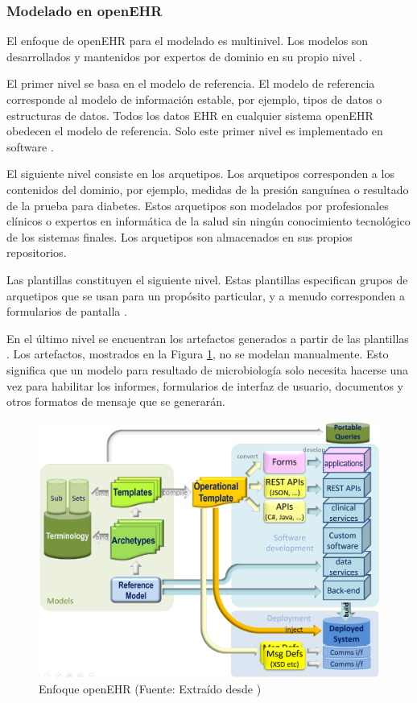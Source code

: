 \subsubsection{Modelado en openEHR}

El enfoque de openEHR para el modelado es multinivel. Los modelos son desarrollados y mantenidos por expertos de dominio en su propio nivel \cite{openEHRArchitecture}.

El primer nivel se basa en el modelo de referencia. El modelo de referencia corresponde al modelo de información estable, por ejemplo, tipos de datos o estructuras de datos. Todos los datos EHR en cualquier sistema openEHR obedecen el modelo de referencia. Solo este primer nivel es implementado en software \cite{openEHRArchitecture}.

El siguiente nivel consiste en los arquetipos. Los arquetipos corresponden a los contenidos del dominio, por ejemplo, medidas de la presión sanguínea o resultado de la prueba para diabetes. Estos arquetipos son modelados por profesionales clínicos o expertos en informática de la salud sin ningún conocimiento tecnológico de los sistemas finales. Los arquetipos son almacenados en sus propios repositorios.

Las plantillas constituyen el siguiente nivel. Estas plantillas especifican grupos de arquetipos que se usan para un propósito particular, y a menudo corresponden a formularios de pantalla \cite{openEHRArchitecture}.

En el último nivel se encuentran los artefactos generados a partir de las plantillas \cite{openEHR}. Los artefactos, mostrados en la Figura \ref{fig:openeEHR_ecosystem}, no se modelan manualmente. Esto significa que un modelo para resultado de microbiología solo necesita hacerse una vez para habilitar los informes, formularios de interfaz de usuario, documentos y otros formatos de mensaje que se generarán.

\begin{figure}[h]
  \centering
  \includegraphics[scale=0.6]{./images/openehr_dev_ecosystem}
  \caption{Enfoque openEHR (Fuente: Extraído desde \cite{openEHR})}
  \label{fig:openeEHR_ecosystem}
\end{figure}
